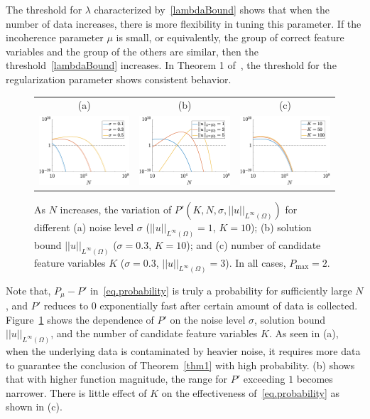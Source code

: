 \documentclass[a4paper,11pt]{article}
\theoremstyle{definition}
\begin{document}
The threshold for $\lambda$ characterized by~\eqref{lambdaBound} shows that when the number of data increases, there is more flexibility in tuning this parameter. If the incoherence parameter $\mu$ is small, or equivalently, the group of correct feature variables and the group of the others are similar, then the threshold~\eqref{lambdaBound} increases. In Theorem 1 of~\cite{wainwright2009sharp}, the threshold for the regularization parameter shows consistent behavior.
\begin{figure}
\centering
\begin{tabular}{ccc}
(a)&(b)&(c)\\
\includegraphics[width=2in]{Figures/prob1.eps}&	
\includegraphics[width=2in]{Figures/prob2.eps}&
\includegraphics[width=2in]{Figures/prob3.eps}
\end{tabular}
\caption{As $N$ increases, the variation of $P'(K,N,\sigma,||u||_{L^\infty(\Omega)})$ for different (a) noise level $\sigma$ ($||u||_{L^\infty(\Omega)}=1$, $K=10$); (b) solution bound $||u||_{L^\infty(\Omega)}$ ($\sigma=0.3$, $K=10$); and (c) number of candidate feature variables $K$ ($\sigma=0.3$, $||u||_{L^\infty(\Omega)}=3$). In all cases, $P_{\max}=2$.}\label{fig.probstudy}
\end{figure}

Note that, $P_\mu-P'$ in~\eqref{eq.probability} is truly a probability for sufficiently large $N$, and $P'$ reduces to $0$ exponentially fast after certain amount of data is collected. Figure~\ref{fig.probstudy} shows the dependence of $P'$ on the noise level $\sigma$, solution bound $||u||_{L^\infty(\Omega)}$, and the number of candidate feature variables $K$. As seen in (a), when the underlying data is contaminated by heavier noise, it requires more data to guarantee the conclusion of Theorem~\ref{thm1} with high probability. (b) shows that with higher function magnitude, the range for $P'$ exceeding $1$ becomes narrower. There is little effect of $K$ on the effectiveness of~\eqref{eq.probability} as shown in (c).
\end{document}

